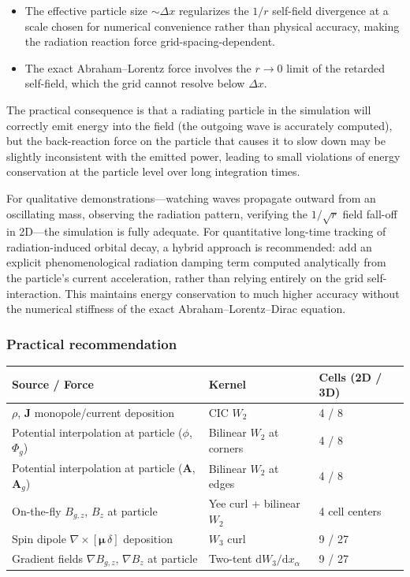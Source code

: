 \documentclass[11pt,a4paper]{article}
\newcommand{\vv}[1]{\mathbf{#1}}
\newcommand{\Phig}{\Phi_g}
\newcommand{\Ag}{\vv{A}_g}
\newcommand{\dd}{\mathrm{d}}
\begin{document}
\begin{itemize}
  \item The effective particle size $\sim\Delta x$ regularizes the $1/r$ self-field divergence at a scale chosen for numerical convenience rather than physical accuracy, making the radiation reaction force grid-spacing-dependent.
  \item The exact Abraham--Lorentz force involves the $r\to 0$ limit of the retarded self-field, which the grid cannot resolve below $\Delta x$.
\end{itemize}

The practical consequence is that a radiating particle in the simulation will correctly emit energy into the field (the outgoing wave is accurately computed), but the back-reaction force on the particle that causes it to slow down may be slightly inconsistent with the emitted power, leading to small violations of energy conservation at the particle level over long integration times.

For qualitative demonstrations---watching waves propagate outward from an oscillating mass, observing the radiation pattern, verifying the $1/\sqrt{r}$ field fall-off in 2D---the simulation is fully adequate.  For quantitative long-time tracking of radiation-induced orbital decay, a hybrid approach is recommended: add an explicit phenomenological radiation damping term computed analytically from the particle's current acceleration, rather than relying entirely on the grid self-interaction.  This maintains energy conservation to much higher accuracy without the numerical stiffness of the exact Abraham--Lorentz--Dirac equation.

\subsubsection*{Practical recommendation}

\begin{center}
\begin{tabular}{@{}L{5.5cm}L{3.5cm}L{3.5cm}@{}}
\toprule
\textbf{Source / Force} & \textbf{Kernel} & \textbf{Cells (2D / 3D)} \\
\midrule
$\rho$, $\vv{J}$ monopole/current deposition & CIC $W_2$ & 4 / 8 \\
Potential interpolation at particle ($\phi$, $\Phig$) & Bilinear $W_2$ at corners & 4 / 8 \\
Potential interpolation at particle ($\vv{A}$, $\Ag$) & Bilinear $W_2$ at edges & 4 / 8 \\
On-the-fly $B_{g,z}$, $B_z$ at particle & Yee curl + bilinear $W_2$ & 4 cell centers \\
Spin dipole $\nabla\times[\boldsymbol{\mu}\,\delta]$ deposition & $W_3$ curl & 9 / 27 \\
Gradient fields $\nabla B_{g,z}$, $\nabla B_z$ at particle & Two-tent $\dd W_3/\dd x_\alpha$ & 9 / 27 \\
\bottomrule
\end{tabular}
\end{center}
\end{document}
